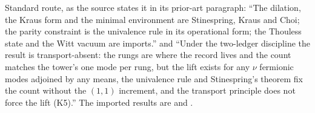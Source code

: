 Standard route, as the source states it in its prior-art paragraph: ``The dilation, the Kraus form and the minimal environment are Stinespring, Kraus and Choi; the parity constraint is the univalence rule in its operational form; the Thouless state and the Witt vacuum are imports.'' and ``Under the two-ledger discipline the result is transport-absent: the rungs are where the record lives and the count matches the tower's one mode per rung, but the lift exists for any $\nu$ fermionic modes adjoined by any means, the univalence rule and Stinespring's theorem fix the count without the $(1,1)$ increment, and the transport principle does not force the lift (K5).'' The imported results are  and .
